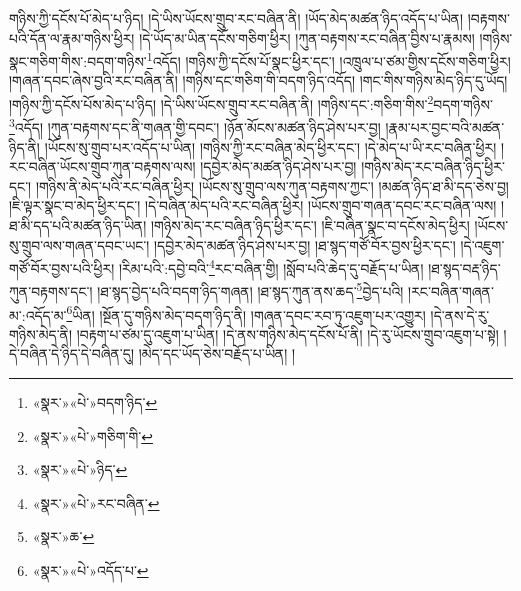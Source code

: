 གཉིས་ཀྱི་དངོས་པོ་མེད་པ་ཉིད། །དེ་ཡིས་ཡོངས་གྲུབ་རང་བཞིན་ནི། །ཡོད་མེད་མཚན་ཉིད་འདོད་པ་ཡིན། །བརྟགས་པའི་དོན་ལ་རྣམ་གཉིས་ཕྱིར། །དེ་ཡོད་མ་ཡིན་དངོས་གཅིག་ཕྱིར། །ཀུན་བརྟགས་རང་བཞིན་བྱིས་པ་རྣམས། །གཉིས་སྣང་གཅིག་གིས་:བདག་གཉིས་\footnote{«སྣར་»«པེ་»བདག་ཉིད་}འདོད། །གཉིས་ཀྱི་དངོས་པོ་སྣང་ཕྱིར་དང་། །འཁྲུལ་པ་ཙམ་གྱིས་དངོས་གཅིག་ཕྱིར། །གཞན་དབང་ཞེས་བྱའི་རང་བཞིན་ནི། །གཉིས་དང་གཅིག་གི་བདག་ཉིད་འདོད། །གང་གིས་གཉིས་མེད་ཉིད་དུ་ཡོད། །གཉིས་ཀྱི་དངོས་པོས་མེད་པ་ཉིད། །དེ་ཡིས་ཡོངས་གྲུབ་རང་བཞིན་ནི། །གཉིས་དང་:གཅིག་གིས་\footnote{«སྣར་»«པེ་»གཅིག་གི་}བདག་གཉིས་\footnote{«སྣར་»«པེ་»ཉིད་}འདོད། །ཀུན་བརྟགས་དང་ནི་གཞན་གྱི་དབང་། །ཉོན་མོངས་མཚན་ཉིད་ཤེས་པར་བྱ། །རྣམ་པར་བྱང་བའི་མཚན་ཉིད་ནི། །ཡོངས་སུ་གྲུབ་པར་འདོད་པ་ཡིན། །གཉིས་ཀྱི་རང་བཞིན་མེད་ཕྱིར་དང་། །དེ་མེད་པ་ཡི་རང་བཞིན་ཕྱིར། །རང་བཞིན་ཡོངས་གྲུབ་ཀུན་བརྟགས་ལས། །དབྱེར་མེད་མཚན་ཉིད་ཤེས་པར་བྱ། །གཉིས་མེད་རང་བཞིན་ཉིད་ཕྱིར་དང་། །གཉིས་ནི་མེད་པའི་རང་བཞིན་ཕྱིར། །ཡོངས་སུ་གྲུབ་ལས་ཀུན་བརྟགས་ཀྱང་། །མཚན་ཉིད་ཐ་མི་དད་ཅེས་བྱ། །ཇི་ལྟར་སྣང་བ་མེད་ཕྱིར་དང་། །དེ་བཞིན་མེད་པའི་རང་བཞིན་ཕྱིར། །ཡོངས་གྲུབ་གཞན་དབང་རང་བཞིན་ལས། །ཐ་མི་དད་པའི་མཚན་ཉིད་ཡིན། །གཉིས་མེད་རང་བཞིན་ཉིད་ཕྱིར་དང་། །ཇི་བཞིན་སྣང་བ་དངོས་མེད་ཕྱིར། །ཡོངས་སུ་གྲུབ་ལས་གཞན་དབང་ཡང་། །དབྱེར་མེད་མཚན་ཉིད་ཤེས་པར་བྱ། །ཐ་སྙད་གཙོ་བོར་བྱས་ཕྱིར་དང་། །དེ་འཇུག་གཙོ་བོར་བྱས་པའི་ཕྱིར། །རིམ་པའི་:དབྱེ་བའི་\footnote{«སྣར་»«པེ་»རང་བཞིན་}རང་བཞིན་གྱི། །སློབ་པའི་ཆེད་དུ་བརྗོད་པ་ཡིན། །ཐ་སྙད་བརྡ་ཉིད་ཀུན་བརྟགས་དང་། །ཐ་སྙད་བྱེད་པའི་བདག་ཉིད་གཞན། །ཐ་སྙད་ཀུན་ནས་ཆད་\footnote{«སྣར་»ཆ་}བྱེད་པའི། །རང་བཞིན་གཞན་མ་:འདོད་མ་\footnote{«སྣར་»«པེ་»འདོད་པ་}ཡིན། །སྔོན་དུ་གཉིས་མེད་བདག་ཉིད་ནི། །གཞན་དབང་རབ་ཏུ་འཇུག་པར་འགྱུར། །དེ་ནས་དེ་རུ་གཉིས་མེད་ནི། །བརྟག་པ་ཙམ་དུ་འཇུག་པ་ཡིན། །དེ་ནས་གཉིས་མེད་དངོས་པོ་ནི། །དེ་རུ་ཡོངས་གྲུབ་འཇུག་པ་སྟེ། །དེ་བཞིན་དེ་ཉིད་དེ་བཞིན་དུ། །མེད་དང་ཡོད་ཅེས་བརྗོད་པ་ཡིན། །
